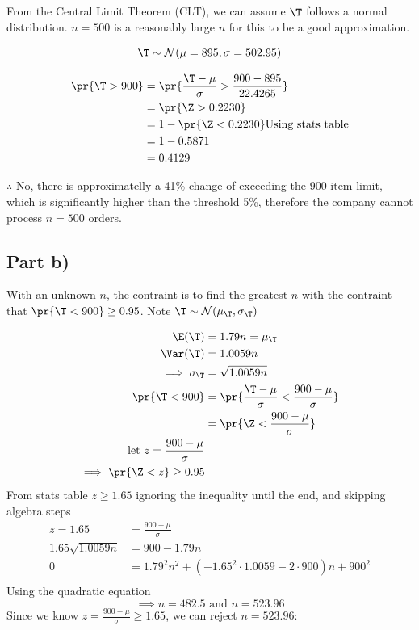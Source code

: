 From the Central Limit Theorem (CLT), we can assume $\T$ follows a normal distribution.
$n = 500$ is a reasonably large $n$ for this to be a good approximation.

\[
\T \sim \mathcal{N}(\mu = 895, \sigma = 502.95)
\]

\begin{align*}
\pr{\T > 900} &= \pr{\frac{\T - \mu}{\sigma} > \frac{900 - 895}{22.4265}} \\
&= \pr{\Z > 0.2230} \\
&= 1 - \pr{\Z < 0.2230}
\text{Using stats table} \\
&= 1 - 0.5871 \\
&= 0.4129
\end{align*}

$\therefore$ No, there is approximatelly a 41\% change of exceeding the 900-item limit,
which is significantly higher than the threshold 5\%, therefore the company cannot process
$n = 500$ orders.

\subsection{Part b)}

With an unknown $n$, the contraint is to find the greatest $n$ with the contraint that
$\pr{\T < 900} \geq 0.95$.
Note $\T \sim \mathcal{N}(\mu_\T, \sigma_\T)$

\begin{align*}
\E(\T) &= 1.79n = \mu_\T \\
\Var(\T) &= 1.0059n \\
\implies \sigma _\T &= \sqrt{1.0059n} \\
\pr{\T < 900} &= \pr{\frac{\T - \mu}{\sigma} < \frac{900 - \mu}{\sigma}} \\
&= \pr{\Z < \frac{900 - \mu}{\sigma}} \\
\text{let } z = \frac{900 - \mu}{\sigma} \\
\implies \pr{\Z < z} \geq 0.95 \\
\end{align*}
From stats table $z \geq 1.65$
ignoring the inequality until the end, and skipping algebra steps
\begin{align*}
z = 1.65 &= \frac{900 - \mu}{\sigma} \\
1.65 \sqrt{1.0059n} &= 900 - 1.79n \\
0 &= 1.79^2n^2 + (-1.65^2 \cdot 1.0059 - 2\cdot 900)n + 900^2 \\
\end{align*}
Using the quadratic equation
\[
\implies n = 482.5 \text{ and } n = 523.96
\]
Since we know $z = \frac{900 - \mu}{\sigma} \geq 1.65$, we can reject $n = 523.96$:

